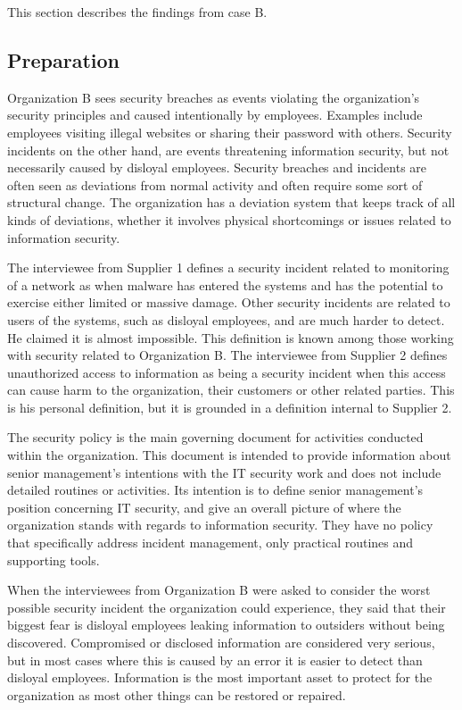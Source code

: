 This section describes the findings from case B.

\subsection{Preparation}
Organization B sees security breaches as events violating the organization's security principles and caused intentionally by employees. Examples include employees visiting illegal websites or sharing their password with others. Security incidents on the other hand, are events threatening information security, but not necessarily caused by disloyal employees. Security breaches and incidents are often seen as deviations from normal activity and often require some sort of structural change. The organization has a deviation system that keeps track of all kinds of deviations, whether it involves physical shortcomings or issues related to information security.

The interviewee from Supplier 1 defines a security incident related to monitoring of a network as when malware has entered the systems and has the potential to exercise either limited or massive damage. Other security incidents are related to users of the systems, such as disloyal employees, and are much harder to detect. He claimed it is almost impossible. This definition is known among those working with security related to Organization B. The interviewee from Supplier 2 defines unauthorized access to information as being a security incident when this access can cause harm to the organization, their customers or other related parties. This is his personal definition, but it is grounded in a definition internal to Supplier 2.

The security policy is the main governing document for activities conducted within the organization. This document is intended to provide information about senior management's intentions with the IT security work and does not include detailed routines or activities. Its intention is to define senior management's position concerning IT security, and give an overall picture of where the organization stands with regards to information security. They have no policy that specifically address incident management, only practical routines and supporting tools.

When the interviewees from Organization B were asked to consider the worst possible security incident the organization could experience, they said that their biggest fear is disloyal employees leaking information to outsiders without being discovered. Compromised or disclosed information are considered very serious, but in most cases where this is caused by an error it is easier to detect than disloyal employees. Information is the most important asset to protect for the organization as most other things can be restored or repaired.

